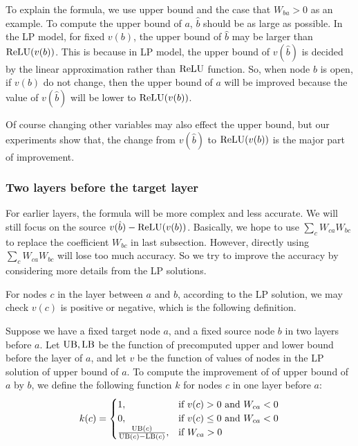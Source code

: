 To explain the formula, we use upper bound and the case that $W_{ba} > 0$ as an example. To compute the upper bound of $a$, $\hat{b}$ should be as large as possible. In the LP model, for fixed $v(b)$, the upper bound of $\hat{b}$ may be larger than $\mathrm{ReLU}(v(b))$. This is because in LP model, the upper bound of $v(\hat{b})$ is decided by the linear approximation rather than $\mathrm{ReLU}$ function. So, when node $b$ is open, if $v(b)$ do not change, then the upper bound of $a$ will be improved because the value of $v(\hat{b})$ will be lower to $\mathrm{ReLU}(v(b))$.
 			
Of course changing other variables may also effect the upper bound, but our experiments show that, the change from $v(\hat{b})$ to $\mathrm{ReLU}(v(b))$ is the major part of improvement. 




\subsubsection*{Two layers before the target layer}

For earlier layers, the formula will be more complex and less accurate. We will still focus on the source $v(\hat{b})-\mathrm{ReLU}(v(b))$. Basically, we hope to use $\sum_c W_{ca}W_{bc}$ to replace the coefficient $W_{bc}$ in last subsection. However, directly using $\sum_c W_{ca}W_{bc}$ will lose too much accuracy. So we try to improve the accuracy by considering more details from the LP solutions.

For nodes $c$ in the layer between $a$ and $b$, according to the LP solution, we may check $v(c)$ is positive or negative, which is the following definition. 

\begin{definition} \label{2layer}
	Suppose we have a fixed target node $a$, and a fixed source node $b$ in two layers before $a$. Let $\mathrm{UB},\mathrm{LB}$ be the function of precomputed upper and lower bound before the layer of $a$, and let $v$ be the function of values of nodes in the LP solution of upper bound of $a$. 
	To compute the improvement of of upper bound of $a$ by $b$, we define the following function $k$ for nodes $c$ in one layer before $a$:
	\begin{align}
		k(c) =
		\begin{cases}
			1, & \text{if } v(c) > 0 \text{ and } W_{ca} < 0\\
			0, & \text{if } v(c) \leq 0 \text{ and } W_{ca} < 0\\
			\frac{\mathrm{UB}(c)}{\mathrm{UB}(c)-\mathrm{LB}(c)}, & \text{if }W_{ca} > 0
		\end{cases}
	\end{align} 
\end{definition} 

